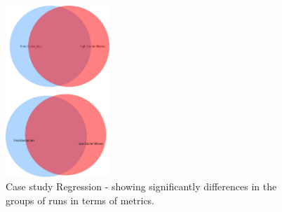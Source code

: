     \begin{figure}[h]
          \centering
            \includegraphics[width=0.350\textwidth]{figures/set_results_cache.jpg}
            \caption{Case study Regression - showing significantly differences in the groups of runs in terms of metrics.}
            \label{fig:case2}
    \end{figure}
    

    